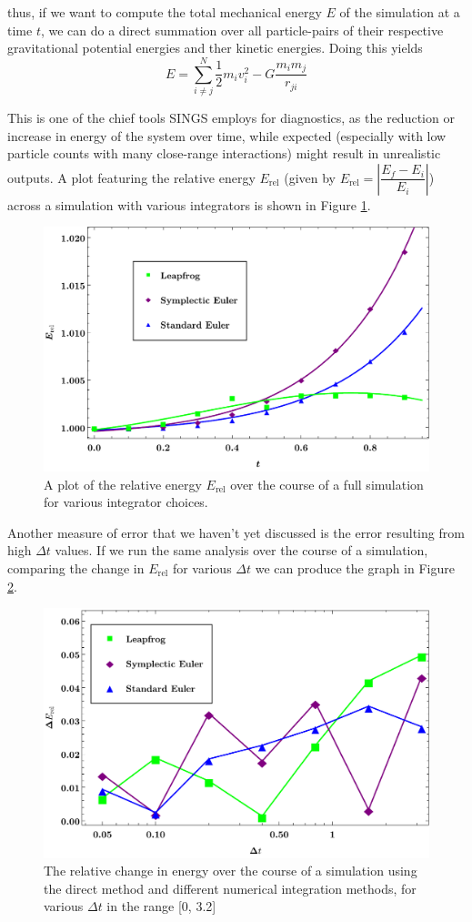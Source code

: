 \documentclass[12pt, twoside, letterpaper]{article}
\begin{document}
\noindent thus, if we want to compute the total mechanical energy $E$ of the simulation at a time $t$, we can do a direct summation over all particle-pairs of their respective gravitational potential energies and ther kinetic energies. Doing this yields
\begin{equation} \label{eq:totenergy}
	E = \sum_{i \neq j}^{N} \frac{1}{2}m_iv_i^2 - G\frac{m_im_j}{r_{ji}}
\end{equation}

This is one of the chief tools SINGS employs for diagnostics, as the reduction or increase in energy of the system over time, while expected (especially with low particle counts with many close-range interactions) might result in unrealistic outputs. A plot featuring the relative energy $E_{\text{rel}}$ (given by $E_{\text{rel}} = \left|\dfrac{E_f - E_i}{E_i}\right|$) across a simulation with various integrators is shown in Figure \ref{fig:energyerror}.
\begin{figure}[h]
\caption{A plot of the relative energy $E_{\text{rel}}$ over the course of a full simulation for various integrator choices.}
\centerline{\includegraphics[width=.75\textwidth]{energyerror.pdf}}
\label{fig:energyerror}
\end{figure}

Another measure of error that we haven't yet discussed is the error resulting from high $\Delta t$ values. If we run the same analysis over the course of a simulation, comparing the change in $E_{\text{rel}}$ for various $\Delta t$ we can produce the graph in Figure \ref{fig:energydeltat}.
\begin{figure}[h!]
\caption{The relative change in energy over the course of a simulation using the direct method and different numerical integration methods, for various $\Delta t$ in the range [0, 3.2]}
\centerline{\includegraphics[width=.72\textwidth]{energydeltat.pdf}}
\label{fig:energydeltat}
\end{figure}
\end{document}
